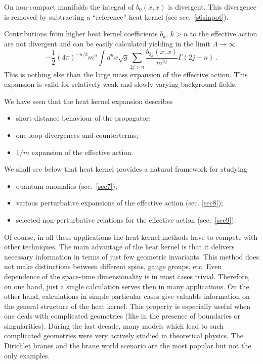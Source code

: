 On non-compact manifolds the integral of $b_0(x,x)$ is divergent.
This divergence is removed by subtracting a ``reference'' heat
kernel (see sec.\ \ref{s6sinpot}).

Contributions from higher heat kernel coefficients $b_k$, $k>n$
to the effective action are not divergent and can be easily
calculated yielding in the limit $\Lambda\to\infty$
\begin{equation}
-\frac 12 (4\pi )^{-n/2} m^n \int d^nx \sqrt{g}
\sum_{2j>n} \frac{b_{2j}(x,x)}{m^{2j}} \Gamma (2j-n)\,.
\label{largemass}
\end{equation}
This is nothing else than the large mass expansion of the effective
action. This expansion is valid for relatively weak and slowly varying
background fields.

We have seen that the heat kernel expansion 
describes
\begin{itemize}
\item short-distance behaviour of the propagator;
\item one-loop divergences and counterterms;
\item $1/m$ expansion of the effective action.
\end{itemize}
We shall see below that heat kernel provides a natural framework
for studying 
\begin{itemize}
\item quantum anomalies (sec.\ \ref{sec7});
\item various perturbative expansions of the effective action
(sec. \ref{sec8});
\item selected non-perturbative relations for the effective
action (sec.\ \ref{sec9}).
\end{itemize}

Of course, in all these applications the heat kernel methods have
to compete with other techniques. The main advantage of the heat
kernel is that it delivers necessary information in terms of just
few geometric invariants. This method does not make distinctions 
between different spins, gauge groups, etc. Even dependence of the
space-time dimensionality is in most cases trivial. Therefore, on
one hand, just a single calculation serves then in many applications.
On the other hand, calculations in simple particular cases give
valuable information on the general structure of the heat kernel.
This property is especially useful when one deals with complicated
geometries (like in the presence of boundaries or singularities).
During the last decade, many models which lead to such complicated
geometries were very actively studied in theoretical physics.
The Dirichlet branes and the brane world scenario are the most 
popular but not the only examples.

